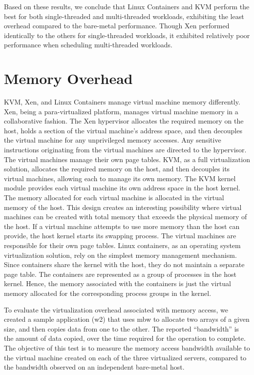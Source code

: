Based on these results, we conclude that Linux Containers and KVM perform the best for both single-threaded and multi-threaded workloads, exhibiting the least overhead compared to the bare-metal performance. Though Xen performed identically to the others for single-threaded workloads, it exhibited relatively poor performance when scheduling multi-threaded workloads.  

\section{Memory Overhead}

KVM, Xen, and Linux Containers manage virtual machine memory differently. Xen, being a para-virtualized platform, manages  virtual machine memory in a collaborative fashion. The Xen hypervisor allocates the required memory on the host, holds a section of the virtual machine's address space, and then decouples the virtual machine for any unprivileged memory accesses. Any sensitive instructions originating from the virtual machines are directed to the hypervisor. The virtual machines manage their own page tables. KVM, as a full virtualization solution, allocates the required memory on the host, and then decouples its virtual machines, allowing each to manage its own memory. The KVM kernel module provides each virtual machine its own address space in the host kernel. The memory allocated for each virtual machine is allocated in the virtual memory of the host. This design creates an interesting possibility where virtual machines can be created with total memory that exceeds the physical memory of the host. If a virtual machine attempts to use more memory than the host can provide, the host kernel starts its swapping process. The virtual machines are responsible for their own page tables. Linux containers, as an operating system virtualization solution, rely on the simplest memory management mechanism. Since containers share the kernel with the host, they do not maintain a separate page table. The containers are represented as a group of processes in the host kernel. Hence, the memory associated with the containers is just the virtual memory allocated for the corresponding process groups in the kernel.


To evaluate the virtualization overhead associated with memory access, we created a sample application (w2) that uses mbw \cite{mbw} to allocate two arrays of a given size, and then copies data from one to the other. The reported ``bandwidth'' is the amount of data copied, over the time required for the operation to complete. The objective of this test is to measure the memory access bandwidth available to the virtual machine created on each of the three virtualized servers, compared to the bandwidth observed on an independent bare-metal host.


